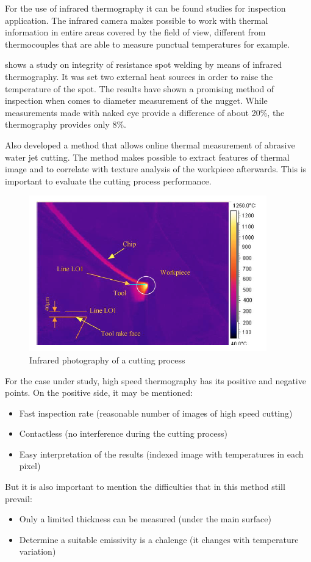 	For the use of infrared thermography it can be found studies for inspection application. The infrared camera makes possible to work with thermal information in entire areas covered by the field of view, different from thermocouples that are able to measure punctual temperatures for example.

	 shows a study on integrity of resistance spot welding by means of infrared thermography. It was set two external heat sources in order to raise the temperature of the spot. The results have shown a promising method of inspection when comes to diameter measurement of the nugget. While measurements made with naked eye provide a difference of about 20\%, the thermography provides only 8\%.

	Also  developed a method that allows online thermal measurement of abrasive water jet cutting. The method makes possible to extract features of thermal image and to correlate with texture analysis of the workpiece afterwards. This is important to evaluate the cutting process performance.

	\begin{figure}[H]
		\centering
		\captionsetup{justification=centering}
		\includegraphics[scale=0.75]{Cap2/InfraRed/exinfrared.png}
		\caption{Infrared photography of a cutting process \cite{abukhshim2006heat}}
		\label{fig:exinfrared}
	\end{figure}

	For the case under study, high speed thermography has its positive and negative points. On the positive side, it may be mentioned:

	\begin{itemize}
		\item Fast inspection rate (reasonable number of images of high speed cutting)
		\item Contactless (no interference during the cutting process)
		\item Easy interpretation of the results (indexed image with temperatures in each pixel)
	\end{itemize}

	But it is also important to mention the difficulties that in this method still prevail:
	
	\begin{itemize}
		\item Only a limited thickness can be measured (under the main surface)
		\item Determine a suitable emissivity is a chalenge (it changes with temperature variation)
	\end{itemize}
